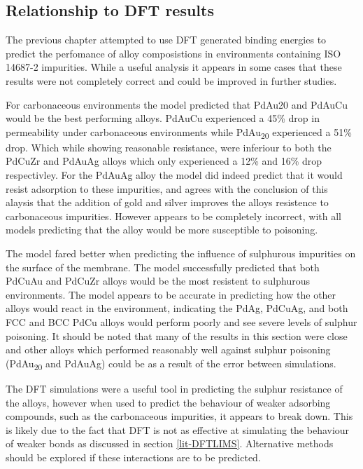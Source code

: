 \subsection{Relationship to DFT results}
The previous chapter attempted to use DFT generated binding energies to predict the perfomance of alloy composistions in environments containing ISO 14687-2 impurities. While a useful analysis it appears in some cases that these results were not completely correct and could be improved in further studies. 

For carbonaceous environments the model predicted that PdAu20 and PdAuCu would be the best performing alloys. PdAuCu experienced a 45\% drop in permeability under carbonaceous environments while PdAu\textsubscript{20} experienced a 51\% drop. Which while showing reasonable resistance, were inferiour to both the PdCuZr and PdAuAg alloys which only experienced a 12\% and 16\% drop respectivley. For the PdAuAg alloy the model did indeed predict that it would resist adsorption to these impurities, and agrees with the conclusion of this alaysis that the addition of gold and silver improves the alloys resistence to carbonaceous impurities. However appears to be completely incorrect, with all models predicting that the alloy would be more susceptible to poisoning. 

The model fared better when predicting the influence of sulphurous impurities on the surface of the membrane. The model successfully predicted that both PdCuAu and PdCuZr alloys would be the most resistent to sulphurous environments. The model appears to be accurate in predicting how the other alloys would react in the environment, indicating the PdAg, PdCuAg, and both FCC and BCC PdCu alloys would perform poorly and see severe levels of sulphur poisoning. It should be noted that many of the results in this section were close and other alloys which performed reasonably well against sulphur poisoning (PdAu\textsubscript{20} and PdAuAg) could be as a result of the error between simulations. 

The DFT simulations were a useful tool in predicting the sulphur resistance of the alloys, however when used to predict the behaviour of weaker adsorbing compounds, such as the carbonaceous impurities, it appears to break down. This is likely due to the fact that DFT is not as effective at simulating the behaviour of weaker bonds as discussed in section \ref{lit-DFTLIMS}. Alternative methods should be explored if these interactions are to be predicted.

